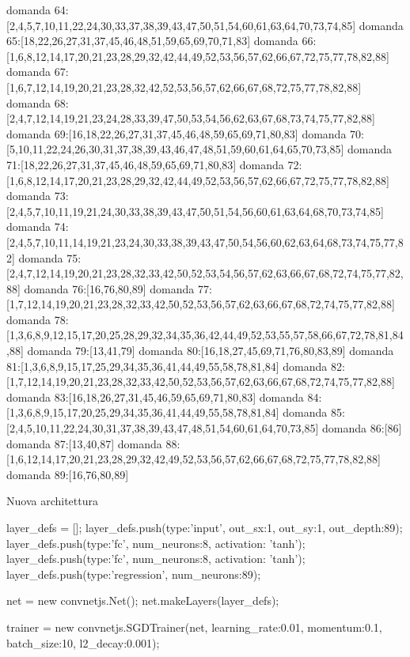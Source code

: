 domanda 64:[2,4,5,7,10,11,22,24,30,33,37,38,39,43,47,50,51,54,60,61,63,64,70,73,74,85]
domanda 65:[18,22,26,27,31,37,45,46,48,51,59,65,69,70,71,83]
domanda 66:[1,6,8,12,14,17,20,21,23,28,29,32,42,44,49,52,53,56,57,62,66,67,72,75,77,78,82,88]
domanda 67:[1,6,7,12,14,19,20,21,23,28,32,42,52,53,56,57,62,66,67,68,72,75,77,78,82,88]
domanda 68:[2,4,7,12,14,19,21,23,24,28,33,39,47,50,53,54,56,62,63,67,68,73,74,75,77,82,88]
domanda 69:[16,18,22,26,27,31,37,45,46,48,59,65,69,71,80,83]
domanda 70:[5,10,11,22,24,26,30,31,37,38,39,43,46,47,48,51,59,60,61,64,65,70,73,85]
domanda 71:[18,22,26,27,31,37,45,46,48,59,65,69,71,80,83]
domanda 72:[1,6,8,12,14,17,20,21,23,28,29,32,42,44,49,52,53,56,57,62,66,67,72,75,77,78,82,88]
domanda 73:[2,4,5,7,10,11,19,21,24,30,33,38,39,43,47,50,51,54,56,60,61,63,64,68,70,73,74,85]
domanda 74:[2,4,5,7,10,11,14,19,21,23,24,30,33,38,39,43,47,50,54,56,60,62,63,64,68,73,74,75,77,82]
domanda 75:[2,4,7,12,14,19,20,21,23,28,32,33,42,50,52,53,54,56,57,62,63,66,67,68,72,74,75,77,82,88]
domanda 76:[16,76,80,89]
domanda 77:[1,7,12,14,19,20,21,23,28,32,33,42,50,52,53,56,57,62,63,66,67,68,72,74,75,77,82,88]
domanda 78:[1,3,6,8,9,12,15,17,20,25,28,29,32,34,35,36,42,44,49,52,53,55,57,58,66,67,72,78,81,84,88]
domanda 79:[13,41,79]
domanda 80:[16,18,27,45,69,71,76,80,83,89]
domanda 81:[1,3,6,8,9,15,17,25,29,34,35,36,41,44,49,55,58,78,81,84]
domanda 82:[1,7,12,14,19,20,21,23,28,32,33,42,50,52,53,56,57,62,63,66,67,68,72,74,75,77,82,88]
domanda 83:[16,18,26,27,31,45,46,59,65,69,71,80,83]
domanda 84:[1,3,6,8,9,15,17,20,25,29,34,35,36,41,44,49,55,58,78,81,84]
domanda 85:[2,4,5,10,11,22,24,30,31,37,38,39,43,47,48,51,54,60,61,64,70,73,85]
domanda 86:[86]
domanda 87:[13,40,87]
domanda 88:[1,6,12,14,17,20,21,23,28,29,32,42,49,52,53,56,57,62,66,67,68,72,75,77,78,82,88]
domanda 89:[16,76,80,89]



Nuova architettura


layer_defs = [];
layer_defs.push({type:'input', out_sx:1, out_sy:1, out_depth:89});
layer_defs.push({type:'fc', num_neurons:8, activation: 'tanh'});
layer_defs.push({type:'fc', num_neurons:8, activation: 'tanh'});
layer_defs.push({type:'regression', num_neurons:89});

net = new convnetjs.Net();
net.makeLayers(layer_defs);

trainer = new convnetjs.SGDTrainer(net, {learning_rate:0.01, momentum:0.1, batch_size:10, l2_decay:0.001});

